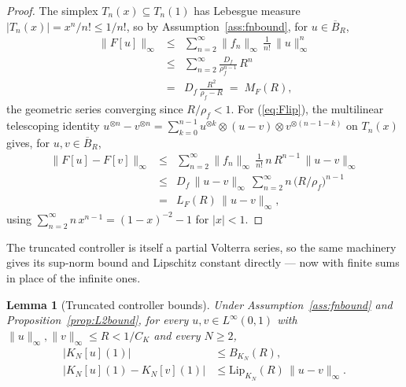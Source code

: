 \documentclass[amsthm]{autart}
\theoremstyle{plain}
\newtheorem{lemma}{Lemma}
\theoremstyle{definition}
\newcommand{\Linf}{L^\infty}
\newcommand{\LipKn}{\mathrm{Lip}_{K_N}}
\begin{document}
\begin{proof}
The simplex $T_n(x) \subseteq T_n(1)$ has Lebesgue measure $|T_n(x)| = x^n/n! \le 1/n!$, so by Assumption~\ref{ass:fnbound}, for $u \in \overline B_R$,
\begin{eqnarray}
\|F[u]\|_\infty &\le & \sum_{n=2}^\infty \|f_n\|_\infty\,\frac{1}{n!}\,\|u\|_\infty^n \nonumber\\
&\le& \sum_{n=2}^\infty \frac{D_f}{\rho_f^{n-1}}\,R^n \nonumber\\
&=& D_f\,\frac{R^2}{\rho_f - R} \;=\; M_F(R),
\label{eq:Fbound_proof}
\end{eqnarray}
the geometric series converging since $R/\rho_f < 1$. For (\ref{eq:Flip}), the multilinear telescoping identity $u^{\otimes n} - v^{\otimes n} = \sum_{k=0}^{n-1} u^{\otimes k} \otimes (u-v) \otimes v^{\otimes(n-1-k)}$ on $T_n(x)$ gives, for $u, v \in \overline B_R$,
\begin{eqnarray}
\|F[u] - F[v]\|_\infty &\le & \sum_{n=2}^\infty \|f_n\|_\infty\,\frac{1}{n!}\,n\,R^{n-1}\,\|u - v\|_\infty \nonumber\\
&\le & D_f\,\|u - v\|_\infty\,\sum_{n=2}^\infty n\,\bigl(R/\rho_f\bigr)^{n-1} \nonumber\\
&=& L_F(R)\,\|u - v\|_\infty,
\label{eq:Flip_proof}
\end{eqnarray}
using $\sum_{n=2}^\infty n\,x^{n-1} = (1-x)^{-2} - 1$ for $|x| < 1$.
\end{proof}

The truncated controller is itself a partial Volterra series, so the same machinery gives its sup-norm bound and Lipschitz constant directly --- now with finite sums in place of the infinite ones.

\begin{lemma}[Truncated controller bounds]\label{lem:KNbounds}
Under Assumption~\ref{ass:fnbound} and Proposition~\ref{prop:L2bound}, for every $u, v \in \Linf(0,1)$ with $\|u\|_\infty, \|v\|_\infty \le R < 1/C_K$ and every $N \ge 2$,
\begin{align}
|K_N[u](1)| &\le B_{K_N}(R), \label{eq:KNbound}\\
|K_N[u](1) - K_N[v](1)| &\le \LipKn(R)\,\|u - v\|_\infty. \label{eq:KNlip}
\end{align}
\end{lemma}
\end{document}
